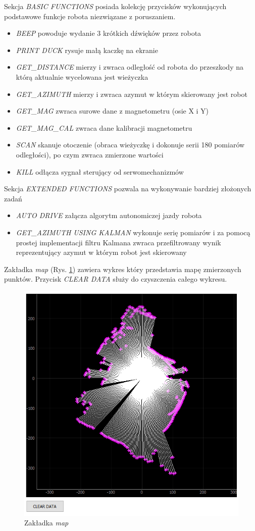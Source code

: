 Sekcja \emph{BASIC FUNCTIONS} posiada kolekcję przycisków wykonujących podstawowe funkcje robota niezwiązane z poruszaniem.
\begin{itemize}
    \item \emph{BEEP} powoduje wydanie 3 krótkich dźwięków przez robota
    \item \emph{PRINT DUCK} rysuje małą kaczkę na ekranie
    \item \emph{GET\_DISTANCE} mierzy i zwraca odległość od robota do przeszkody na którą aktualnie wycelowana jest wieżyczka
    \item \emph{GET\_AZIMUTH} mierzy i zwraca azymut w którym skierowany jest robot
    \item \emph{GET\_MAG} zwraca surowe dane z magnetometru (osie X i Y)
    \item \emph{GET\_MAG\_CAL} zwraca dane kalibracji magnetometru
    \item \emph{SCAN} skanuje otoczenie (obraca wieżyczkę i dokonuje serii 180 pomiarów odległości), po czym zwraca zmierzone wartości
    \item \emph{KILL} odłącza sygnał sterujący od serwomechanizmów
\end{itemize}

Sekcja \emph{EXTENDED FUNCTIONS} pozwala na wykonywanie bardziej złożonych zadań
\begin{itemize}
    \item \emph{AUTO DRIVE} załącza algorytm autonomiczej jazdy robota
    \item \emph{GET\_AZIMUTH USING KALMAN} wykonuje serię pomiarów i za pomocą prostej implementacji filtru Kalmana\cite{Kedzierski2016} zwraca przefiltrowany wynik reprezentujący azymut w którym robot jest skierowany
\end{itemize}

Zakładka \emph{map} (Rys. \ref{fig:main-app-map-section}) zawiera wykres który przedstawia mapę zmierzonych punktów. Przycisk \emph{CLEAR DATA} służy do czyszczenia całego wykresu.
\begin{figure}[ht]
	\centering
		\includegraphics[width=0.8\linewidth]{rys/main-app-view-map.PNG}
	\caption{Zakładka \emph{map}}
	\label{fig:main-app-map-section}
\end{figure}

